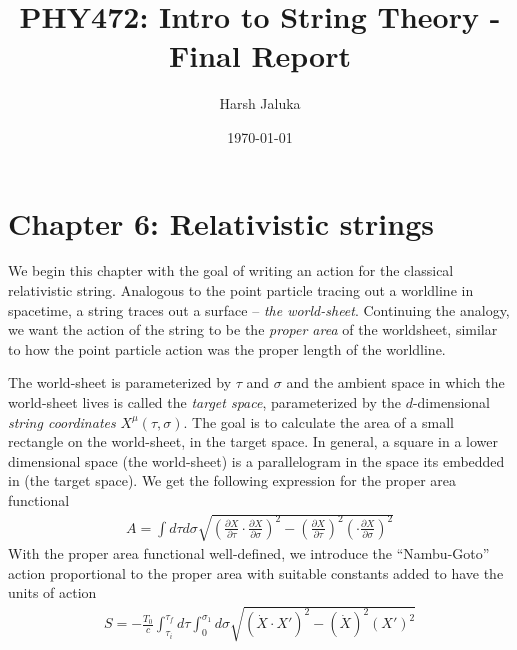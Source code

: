 \documentclass[11pt]{article}
\title{PHY472: Intro to String Theory - Final Report}
\author{Harsh Jaluka}
\date{\today}
\begin{document}
\begin{titlepage}
\maketitle 
\end{titlepage}

\newpage 
\section*{Chapter 6: Relativistic strings}
We begin this chapter with the goal of writing an action for the classical relativistic string. Analogous to the point particle tracing out a worldline in spacetime, a string traces out a surface -- \textit{the world-sheet}. Continuing the analogy, we want the action of the string to be the \textit{proper area} of the worldsheet, similar to how the point particle action was the proper length of the worldline. 

The world-sheet is parameterized by $\tau$ and $\sigma$ and the ambient space in which the world-sheet lives is called the \textit{target space}, parameterized by the $d$-dimensional \textit{string coordinates} $X^\mu(\tau, \sigma)$. 
The goal is to calculate the area of a small rectangle on the world-sheet, in the target space. In general, a square in a lower dimensional space (the world-sheet) is a parallelogram in the space its embedded in (the target space). We get the following expression for the proper area functional
\begin{align*}
    A = \int  d \tau d\sigma \sqrt{\left( \frac{\partial X}{\partial \tau} \cdot \frac{\partial X}{\partial \sigma} \right)^2 - \left( \frac{\partial X}{\partial \tau} \right)^2 \left( \cdot \frac{\partial X}{\partial \sigma}\right)^2 }\tag{6.33}
\end{align*}
With the proper area functional well-defined, we introduce the ``Nambu-Goto'' action proportional to the proper area with suitable constants added to have the units of action 
\begin{align*}
    S = - \frac{T_0}{c} \int_{\tau_i}^{\tau_f } d\tau \int_0^{\sigma_1} d\sigma \sqrt{(\dot{X} \cdot X')^2 - (\dot{X})^2 (X')^2} \tag{6.39}
\end{align*}
\end{document}

